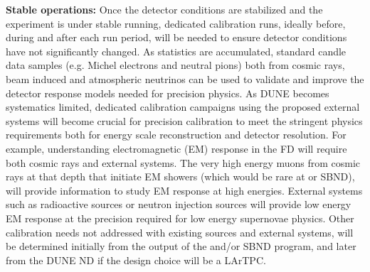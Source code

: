 \textbf{Stable operations:} Once the detector conditions are stabilized and the experiment is under stable running, dedicated calibration runs, ideally before, during and after each run period, will be needed to ensure detector conditions have not significantly changed. As statistics are accumulated, standard candle data samples (e.g. Michel electrons and neutral pions) both from cosmic rays, beam induced and atmospheric neutrinos can be used to validate and improve the detector response models needed for precision physics.  As DUNE becomes systematics limited, dedicated calibration campaigns using the proposed external systems will become crucial for precision calibration to meet the stringent physics requirements both for energy scale reconstruction and detector resolution. For example, understanding electromagnetic (EM) response in the FD will require both cosmic rays and external systems. The very high energy muons from cosmic rays at that depth that initiate EM showers (which would be rare at  or SBND), will provide information to study EM response at high energies. External systems such as radioactive sources or neutron injection sources will provide low energy EM response at the precision required for low energy supernovae physics. Other calibration needs not addressed with existing sources and external systems, will be determined initially from the output of the  and\slash or SBND program, and later from the DUNE ND if the design choice will be a LArTPC. 



